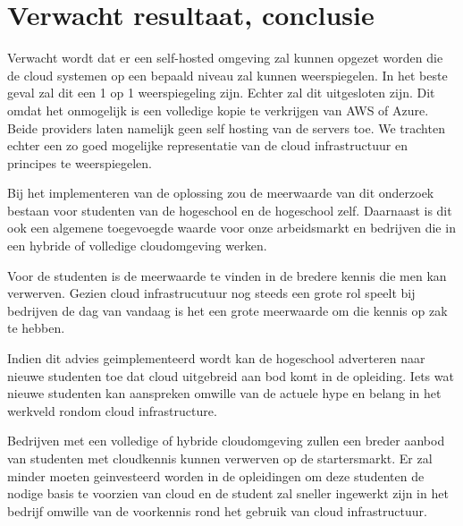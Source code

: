 

\section{Verwacht resultaat, conclusie}%
\label{sec:verwachte_resultaten}
Verwacht wordt dat er een self-hosted omgeving zal kunnen opgezet worden die de cloud systemen op een bepaald niveau zal kunnen weerspiegelen. In het beste geval zal dit een 1 op 1 weerspiegeling zijn. Echter zal dit uitgesloten zijn. Dit omdat het onmogelijk is een volledige kopie te verkrijgen van AWS of Azure. Beide providers laten namelijk geen self hosting van de servers toe. We trachten echter een zo goed mogelijke representatie van de cloud infrastructuur en principes te weerspiegelen. 

Bij het implementeren van de oplossing zou de meerwaarde van dit onderzoek bestaan voor studenten van de hogeschool en de hogeschool zelf. Daarnaast is dit ook een algemene toegevoegde waarde voor onze arbeidsmarkt en bedrijven die in een hybride of volledige cloudomgeving werken. 

Voor de studenten is de meerwaarde te vinden in de bredere kennis die men kan verwerven. Gezien cloud infrastrucutuur nog steeds een grote rol speelt bij bedrijven de dag van vandaag is het een grote meerwaarde om die kennis op zak te hebben.

Indien dit advies geimplementeerd wordt kan de hogeschool adverteren naar nieuwe studenten toe dat cloud uitgebreid aan bod komt in de opleiding. Iets wat nieuwe studenten kan aanspreken omwille van de actuele hype en belang in het werkveld rondom cloud infrastructure.

Bedrijven met een volledige of hybride cloudomgeving zullen een breder aanbod van studenten met cloudkennis kunnen verwerven op de startersmarkt. Er zal minder moeten geinvesteerd worden in de opleidingen om deze studenten de nodige basis te voorzien van cloud en de student zal sneller ingewerkt zijn in het bedrijf omwille van de voorkennis rond het gebruik van cloud infrastructuur.


